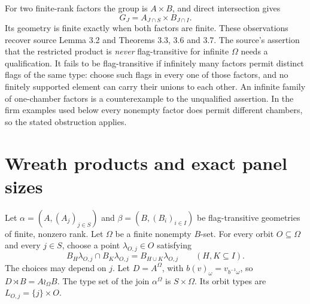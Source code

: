 For two finite-rank factors the group is $A\times B$, and direct
intersection gives
\[
 G_J=A_{J\cap S}\times B_{J\cap I}.
\]
Its geometry is finite exactly when both factors are finite. These
observations recover source Lemma 3.2 and Theorems 3.3, 3.6 and 3.7.
The source's assertion that the restricted product is \emph{never}
flag-transitive for infinite $\Omega$ needs a qualification. It fails
to be flag-transitive if infinitely many factors permit distinct flags
of the same type: choose such flags in every one of those factors, and
no finitely supported element can carry their unions to each other.
An infinite family of one-chamber factors is a counterexample to the
unqualified assertion. In the firm examples used below every nonempty
factor does permit different chambers, so the stated obstruction applies.

\section{Wreath products and exact panel sizes}
Let $\alpha=(A,(A_j)_{j\in S})$ and
$\beta=(B,(B_i)_{i\in I})$ be flag-transitive geometries of finite,
nonzero rank. Let $\Omega$ be a finite nonempty $B$-set. For every orbit
$O\subseteq\Omega$ and every $j\in S$, choose a point
$\lambda_{O,j}\in O$ satisfying
\begin{equation}\label{eq:wreath-ipo}
 B_H\lambda_{O,j}\cap B_K\lambda_{O,j}
       =B_{H\cup K}\lambda_{O,j}\qquad(H,K\subseteq I).
\end{equation}
The choices may depend on $j$. Let $D=A^\Omega$, with
$b(v)_\omega=v_{b^{-1}\omega}$, so $D\rtimes B=A\wr_\Omega B$.
The type set of the join $\alpha^\Omega$ is $S\times\Omega$.
Its orbit types are $L_{O,j}=\{j\}\times O$.

